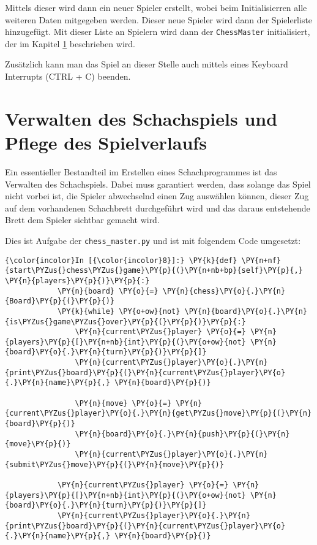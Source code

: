     Mittels dieser wird dann ein neuer Spieler erstellt, wobei beim
Initialisierren alle weiteren Daten mitgegeben werden. Dieser neue
Spieler wird dann der Spielerliste hinzugefügt. Mit dieser Liste an
Spielern wird dann der \texttt{ChessMaster} initialisiert, der im
Kapitel \ref{verwalten-des-schachspiels-und-pflege-des-spielverlaufs} beschrieben wird.

Zusätzlich kann man das Spiel an dieser Stelle auch mittels eines
Keyboard Interrupts (CTRL + C) beenden.

    \section{Verwalten des Schachspiels und Pflege des
Spielverlaufs}\label{verwalten-des-schachspiels-und-pflege-des-spielverlaufs}

Ein essentieller Bestandteil im Erstellen eines Schachprogrammes ist das
Verwalten des Schachspiels. Dabei muss garantiert werden, dass solange
das Spiel nicht vorbei ist, die Spieler abwechselnd einen Zug auswählen
können, dieser Zug auf dem vorhandenen Schachbrett durchgeführt wird und das
daraus entstehende Brett dem Spieler sichtbar gemacht wird.

Dies ist Aufgabe der \texttt{chess\_master.py} und ist mit folgendem
Code umgesetzt:

    \begin{Verbatim}[commandchars=\\\{\}]
{\color{incolor}In [{\color{incolor}8}]:} \PY{k}{def} \PY{n+nf}{start\PYZus{}chess\PYZus{}game}\PY{p}{(}\PY{n+nb+bp}{self}\PY{p}{,} \PY{n}{players}\PY{p}{)}\PY{p}{:}
            \PY{n}{board} \PY{o}{=} \PY{n}{chess}\PY{o}{.}\PY{n}{Board}\PY{p}{(}\PY{p}{)}
            \PY{k}{while} \PY{o+ow}{not} \PY{n}{board}\PY{o}{.}\PY{n}{is\PYZus{}game\PYZus{}over}\PY{p}{(}\PY{p}{)}\PY{p}{:}
                \PY{n}{current\PYZus{}player} \PY{o}{=} \PY{n}{players}\PY{p}{[}\PY{n+nb}{int}\PY{p}{(}\PY{o+ow}{not} \PY{n}{board}\PY{o}{.}\PY{n}{turn}\PY{p}{)}\PY{p}{]}
                \PY{n}{current\PYZus{}player}\PY{o}{.}\PY{n}{print\PYZus{}board}\PY{p}{(}\PY{n}{current\PYZus{}player}\PY{o}{.}\PY{n}{name}\PY{p}{,} \PY{n}{board}\PY{p}{)}
        
                \PY{n}{move} \PY{o}{=} \PY{n}{current\PYZus{}player}\PY{o}{.}\PY{n}{get\PYZus{}move}\PY{p}{(}\PY{n}{board}\PY{p}{)}
                \PY{n}{board}\PY{o}{.}\PY{n}{push}\PY{p}{(}\PY{n}{move}\PY{p}{)}
                \PY{n}{current\PYZus{}player}\PY{o}{.}\PY{n}{submit\PYZus{}move}\PY{p}{(}\PY{n}{move}\PY{p}{)}
        
            \PY{n}{current\PYZus{}player} \PY{o}{=} \PY{n}{players}\PY{p}{[}\PY{n+nb}{int}\PY{p}{(}\PY{o+ow}{not} \PY{n}{board}\PY{o}{.}\PY{n}{turn}\PY{p}{)}\PY{p}{]}
            \PY{n}{current\PYZus{}player}\PY{o}{.}\PY{n}{print\PYZus{}board}\PY{p}{(}\PY{n}{current\PYZus{}player}\PY{o}{.}\PY{n}{name}\PY{p}{,} \PY{n}{board}\PY{p}{)}
\end{Verbatim}

